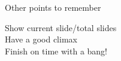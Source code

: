 \documentclass{beamer}
\begin{document}
\begin{frame}{\color{white}Other points to remember}
	\begin{center}
		\color{white}
		\Huge{Show current slide/total slides}\\
		\pause
		\Huge{Have a good climax}\\
		\pause
		\Huge{Finish on time with a bang!}\\
	\end{center}
\end{frame}
%
\end{document}
